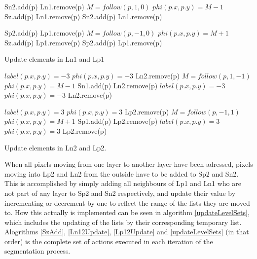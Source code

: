 \begin{algorithm}[h!]
\begin{algorithmic}[1] %
		\State Sn2.add(p)
		\State Ln1.remove(p)
	\Else
		\State $M = follow(p, 1, 0)$ 
		\State $phi(p.x, p.y) = M-1$
			\State Sz.add(p)
			\State Ln1.remove(p)
			\State Sn2.add(p)
			\State Ln1.remove(p)
		\EndIf
	\EndIf
\EndFor

		\State Sp2.add(p)
		\State Lp1.remove(p)
	\Else
		\State $M = follow(p, -1, 0)$ 
		\State $phi(p.x, p.y) = M+1$
			\State Sz.add(p)
			\State Lp1.remove(p)
			\State Sp2.add(p)
			\State Lp1.remove(p)
		\EndIf
	\EndIf
\EndFor
\end{algorithmic}
\caption{Update elements in Ln1 and Lp1}
\label{Ln12Update}
\end{algorithm}

\begin{algorithm}[h!]
\begin{algorithmic}[1] %
		\State $label(p.x, p.y) = -3$
		\State $phi(p.x, p.y) = -3$
		\State Ln2.remove(p)
	\Else
		\State $M = follow(p, 1, -1)$ 
		\State $phi(p.x, p.y) = M-1$
			\State Sn1.add(p)
			\State Ln2.remove(p)
			\State $label(p.x, p.y) = -3$
			\State $phi(p.x, p.y) = -3$
			\State Ln2.remove(p)
		\EndIf
	\EndIf
\EndFor

		\State $label(p.x, p.y) = 3$
		\State $phi(p.x, p.y) = 3$
		\State Lp2.remove(p)
	\Else
		\State $M = follow(p, -1, 1)$ 
		\State $phi(p.x, p.y) = M+1$
			\State Sp1.add(p)
			\State Lp2.remove(p)
			\State $label(p.x, p.y) = 3$
			\State $phi(p.x, p.y) = 3$
			\State Lp2.remove(p)
		\EndIf
	\EndIf
\EndFor
\end{algorithmic}
\caption{Update elements in Ln2 and Lp2.}
\label{Lp12Update}
\end{algorithm}

When all pixels moving from one layer to another layer have been adressed, pixels moving into Lp2 and Ln2 from the outside have to be added to Sp2 and Sn2. This is accomplished by simply adding all neighbours of Lp1 and Ln1 who are not part of any layer to Sp2 and Sn2 respectively, and update their value by incrementing or decrement by one to reflect the range of the lists they are moved to. How this actually is implemented can be seen in algorithm \ref{updateLevelSets}, which includes the updating of the lists by their corresponding temporary list. Alogrithms \ref{SzAdd}, \ref{Ln12Update}, \ref{Lp12Update} and \ref{updateLevelSets} (in that order) is the complete set of actions executed in each iteration of the segmentation process.


